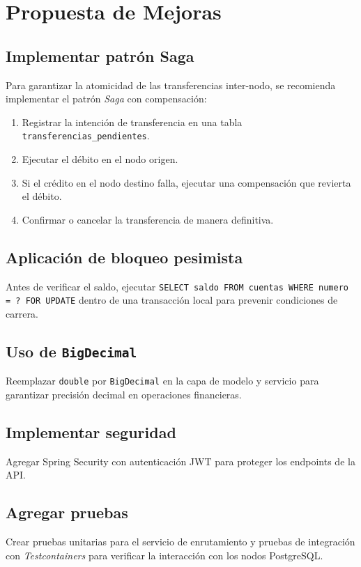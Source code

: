 \documentclass[12pt, a4paper]{article}
\begin{document}
\section{Propuesta de Mejoras}

\subsection{Implementar patrón Saga}
Para garantizar la atomicidad de las transferencias inter-nodo, se recomienda implementar el patrón \textit{Saga} con compensación:

\begin{enumerate}
  \item Registrar la intención de transferencia en una tabla \texttt{transferencias\_pendientes}.
  \item Ejecutar el débito en el nodo origen.
  \item Si el crédito en el nodo destino falla, ejecutar una compensación que revierta el débito.
  \item Confirmar o cancelar la transferencia de manera definitiva.
\end{enumerate}

\subsection{Aplicación de bloqueo pesimista}
Antes de verificar el saldo, ejecutar \texttt{SELECT saldo FROM cuentas WHERE numero = ? FOR UPDATE} dentro de una transacción local para prevenir condiciones de carrera.

\subsection{Uso de \texttt{BigDecimal}}
Reemplazar \texttt{double} por \texttt{BigDecimal} en la capa de modelo y servicio para garantizar precisión decimal en operaciones financieras.

\subsection{Implementar seguridad}
Agregar Spring Security con autenticación JWT para proteger los endpoints de la API.

\subsection{Agregar pruebas}
Crear pruebas unitarias para el servicio de enrutamiento y pruebas de integración con \textit{Testcontainers} para verificar la interacción con los nodos PostgreSQL.
\end{document}
